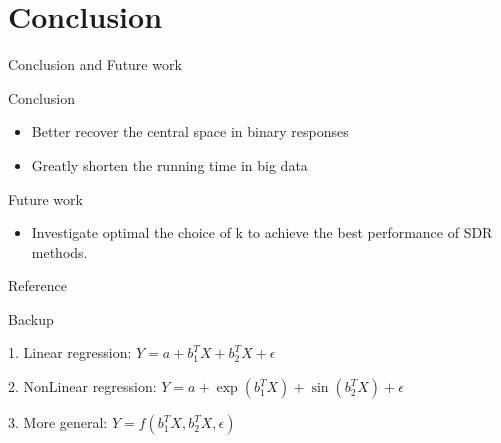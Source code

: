 \documentclass[ignorenonframetext,]{beamer}
\providecommand{\tightlist}{%
  \setlength{\itemsep}{0pt}\setlength{\parskip}{0pt}}
\begin{document}
\section{Conclusion}\label{conclusion}

\begin{frame}{Conclusion and Future work}

\begin{block}{Conclusion}

\begin{itemize}
\tightlist
\item
  Better recover the central space in binary responses
\item
  Greatly shorten the running time in big data
\end{itemize}

\end{block}

\begin{block}{Future work}

\begin{itemize}
\tightlist
\item
  Investigate optimal the choice of k to achieve the best performance of
  SDR methods.
\end{itemize}

\end{block}

\end{frame}

\begin{frame}{Reference}

\end{frame}

\begin{frame}{Backup}

\begin{examples}

1. Linear regression: $Y = a + b_1^TX + b_2^TX + \epsilon$

2. NonLinear regression: $Y = a + \exp(b_1^TX) + \sin(b_2^TX) + \epsilon$

3. More general: $Y = f(b_1^TX, b_2^TX, \epsilon)$
\end{examples}

\end{frame}
\end{document}
